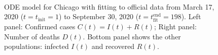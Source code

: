 \documentclass[11pt]{article}
\begin{document}
\begin{figure}
	\centering
	 \\
	\caption{ODE model for Chicago with fitting to official data from March 17, 2020 ($t = t_\text{init} = 1$) to September 30, 2020 ($t = t_\text{fit}^\text{end} = 198$).
		Left panel: Confirmed cases $C(t) = I(t) + R(t)$; Right panel: Number of deaths $D(t)$.
		Bottom panel shows the other populations: infected $I(t)$ and recovered $R(t)$.}
	\label{fig:ode_results}
\end{figure}
\end{document}
